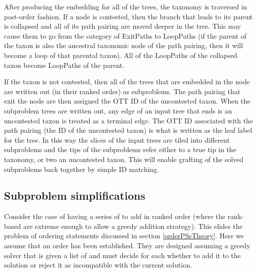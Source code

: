 \documentclass[11pt]{article}
\begin{document}
After producing the embedding for all of the trees, the taxonomy is traversed in post-order
    fashion.
If a node is contested, then the branch that leads to its parent is collapsed and
    all of its path pairing are moved deeper in the tree.
This may cause them to go from the category of ExitPaths to LoopPaths (if the parent of the
    taxon is also the ancestral taxonomic node of the path pairing, then it will become
    a loop of that parental taxon).
All of the LoopPaths of the collapsed taxon become LoopPaths of the parent.

If the taxon is not contested, then all of the trees that are embedded in the node
    are written out (in their ranked order) as subproblems.
The path pairing that exit the node are then assigned the OTT ID of the uncontested taxon.
When the subproblem trees are written out, any edge of an input tree that ends is an uncontested
    taxon is treated as a terminal edge.
The OTT ID associated with the path pairing (the ID of the uncontested taxon) is what is
    written as the leaf label for the tree.
In this way the slices of the input trees are tiled into different subproblems and the tips
    of the subproblems refer either to a true tip in the taxonomy, or two an uncontested taxon.
This will enable grafting of the solved subproblems back together by simple ID matching.

\subsection{Subproblem simplifications}\label{simplificationTheory}
Consider the case of having a series of \pss to add in ranked order (where the
    rank-based are extreme enough to allow a greedy addition strategy).
This elides the problem of ordering statements discussed in section \ref{orderPSsTheory}. 
Here we assume that an order has been established.
They are designed assuming a greedy solver that is given a list of \pss and must decide
    for each whether to add it to the solution or reject it as incompatible with the 
    current solution.
\end{document}
